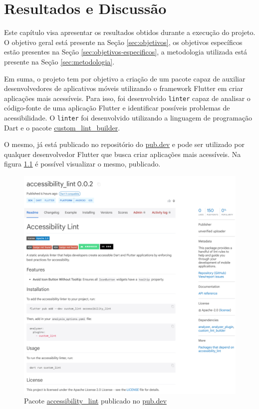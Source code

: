 \chapter{Resultados e Discussão}

Este capítulo visa apresentar os resultados obtidos durante a execução do projeto. O objetivo geral está presente na Seção \ref{sec:objetivos}, os objetivos específicos estão presentes na Seção \ref{sec:objetivos-especificos}, a metodologia utilizada está presente na Seção \ref{sec:metodologia}.

Em suma, o projeto tem por objetivo a criação de um pacote capaz de auxiliar desenvolvedores de aplicativos móveis utilizando o framework Flutter em criar aplicações mais acessíveis. Para isso, foi desenvolvido \texttt{linter} capaz de analisar o código-fonte de uma aplicação Flutter e identificar possíveis problemas de acessibilidade. O \texttt{linter} foi desenvolvido utilizando a linguagem de programação Dart e o pacote \href{https://pub.dev/packages/custom_lint_builder}{custom\_lint\_builder}.

O mesmo, já está publicado no repositório do \href{https://pub.dev/packages/accessibility_lint}{pub.dev} e pode ser utilizado por qualquer desenvolvedor Flutter que busca criar aplicações mais acessíveis. Na figura \ref{fig:pacote-publicado-pub-dev} é possível visualizar o mesmo, publicado.

\begin{figure}[!ht]
	\centering
	\caption{Pacote \href{https://pub.dev/packages/accessibility_lint}{accessibility\_lint} publicado no \href{https://pub.dev}{pub.dev}}\label{fig:pacote-publicado-pub-dev}
	\includegraphics[width=400pt]{Assets/PacotePublicadoPubDev.png}
\end{figure}

